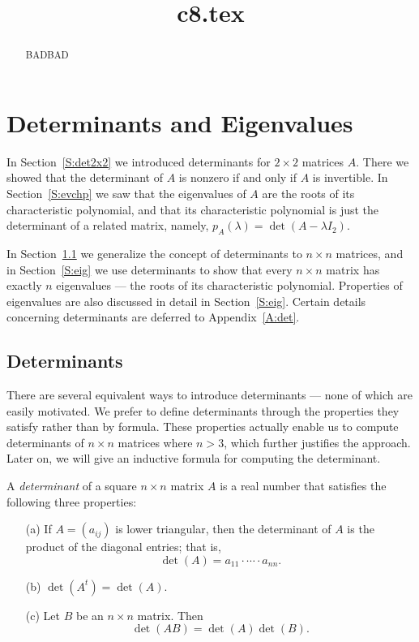 \documentclass{ximera}
\title{c8.tex}
\begin{document}
\begin{abstract}
BADBAD
\end{abstract}
\maketitle

\chapter{Determinants and Eigenvalues}
\label{C:D&E}

\normalsize

In Section~\ref{S:det2x2} we introduced determinants for $2\times 2$
matrices $A$.  There we showed that the determinant of $A$
is nonzero if and only if $A$ is invertible.  In Section~\ref{S:evchp} 
we saw that the eigenvalues of $A$ are the roots of its 
characteristic polynomial, and that its characteristic polynomial
is just the determinant of a related matrix, namely, 
$p_A(\lambda) = \det(A-\lambda I_2)$. 

In Section~\ref{S:det} we generalize the concept of determinants to
$n\times n$ matrices, and in Section~\ref{S:eig} we use determinants 
to show that every $n\times n$ matrix has exactly $n$ eigenvalues --- 
the roots of its characteristic polynomial.  Properties of eigenvalues 
are also discussed in detail in Section~\ref{S:eig}.
Certain details concerning determinants are deferred to Appendix~\ref{A:det}.



\section{Determinants} 
\label{S:det}
 
There are several equivalent ways to introduce determinants --- none of which 
are easily motivated.  We prefer to define determinants through the properties 
they satisfy rather than by formula.  These properties actually enable us to 
compute determinants of $n\times n$ matrices where $n>3$, which further 
justifies the approach. Later on, we will give an inductive formula 
 for computing the determinant. 
 
\begin{Def}  \label{D:determinants}
A {\em determinant\/} of a square $n\times n$ matrix $A$ is a real
number that satisfies the following three properties:
\begin{itemize} 
\item[(a)]  If $A=(a_{ij})$ is lower 
triangular, then
the determinant of $A$ is the product of the diagonal entries;
that is,
\[
\det(A) = a_{11}\cdot\cdots\cdot a_{nn}.
\]
\item[(b)]  $\det(A^t)=\det(A)$.
\item[(c)]  Let $B$ be an $n\times n$ matrix.  
Then
\begin{equation} \label{e:detproduct}
\det(AB) = \det(A)\det(B).
\end{equation}
\end{itemize}
\end{Def} 
\end{document}
